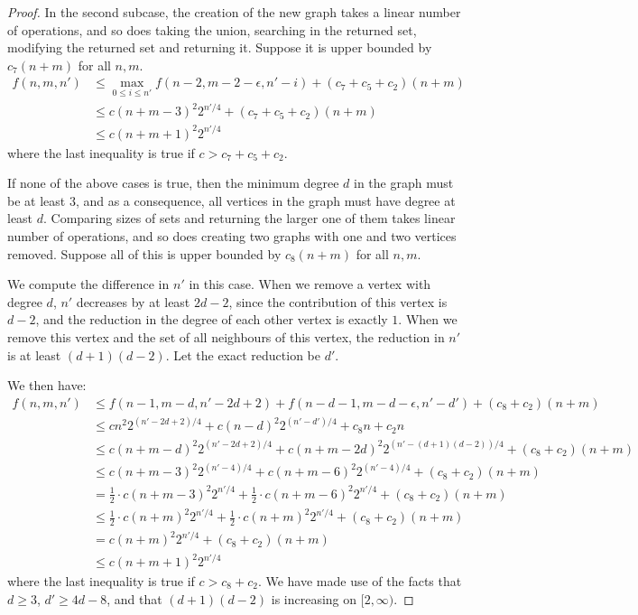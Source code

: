 \documentclass[answers]{exam}
\begin{document}
\begin{questions}
\begin{solution}
\begin{proof}
    In the second subcase, the creation of the new graph takes a linear number of operations, and so does taking the union, searching in the returned set, modifying the returned set and returning it.
    Suppose it is upper bounded by $c_7(n + m)$ for all $n, m$.
    \begin{align*}
        f(n, m, n') &\le \max_{0 \le i \le n'}f(n - 2, m - 2 - \epsilon, n' - i) + (c_7 + c_5 + c_2)(n + m)\\
                &\le c(n + m - 3)^2 2^{n'/4} + (c_7 + c_5 + c_2)(n + m)\\
                &\le c(n + m + 1)^2 2^{n'/4}
    \end{align*}
    where the last inequality is true if $c > c_7 + c_5 + c_2$.

    If none of the above cases is true, then the minimum degree $d$ in the graph must be at least $3$, and as a consequence, all vertices in the graph must have degree at least $d$.
    Comparing sizes of sets and returning the larger one of them takes linear number of operations, and so does creating two graphs with one and two vertices removed. 
    Suppose all of this is upper bounded by $c_8 (n + m)$ for all $n, m$.

    We compute the difference in $n'$ in this case. When we remove a vertex with degree $d$, $n'$ decreases by at least $2d - 2$, since the contribution of this vertex is $d - 2$, and the reduction
    in the degree of each other vertex is exactly $1$. 
    When we remove this vertex and the set of all neighbours of this vertex, the reduction in $n'$ is at least $(d + 1)(d - 2)$. Let the exact reduction be $d'$. 

    We then have:
    \begin{align*}
        f(n, m, n') &\le f(n - 1, m - d, n' - 2d + 2) + f(n - d - 1, m - d - \epsilon, n' - d') + (c_8 + c_2)(n + m)\\
                &\le cn^2 2^{(n' - 2d + 2) / 4} + c(n - d)^2
    2^{(n' - d') / 4} + c_8 n + c_2 n \\
                &\le c(n + m - d)^2 2^{(n' - 2d + 2) / 4} + c(n + m - 2d)^2 2^{(n' - (d+1)(d-2)) / 4} + (c_8 + c_2)(n + m) \\
                &\le c(n + m - 3)^2 2^{(n' - 4) / 4} + c(n + m - 6)^2 2^{(n' - 4) / 4} + (c_8 + c_2)(n + m)\\
                &= \frac{1}{2} \cdot c(n + m - 3)^2 2^{n' / 4} + \frac{1}{2} \cdot c(n + m - 6)^2 2^{n' / 4} + (c_8 + c_2)(n + m)\\
                &\le \frac{1}{2} \cdot c(n + m)^2 2^{n'/4} + \frac{1}{2} \cdot c(n + m)^2 2^{n'/4} + (c_8 + c_2)(n + m)\\
                &= c(n + m)^2 2^{n'/4} + (c_8 + c_2)(n + m)\\
                &\le c(n + m + 1)^2 2^{n'/4}
    \end{align*}
    where the last inequality is true if $c > c_8 + c_2$. We have made use of the facts that $d \ge 3$, $d' \ge 4d - 8$, and that $(d + 1)(d - 2)$ is increasing on $[2, \infty)$.


\end{proof}
\end{solution}
\end{questions}
\end{document}
